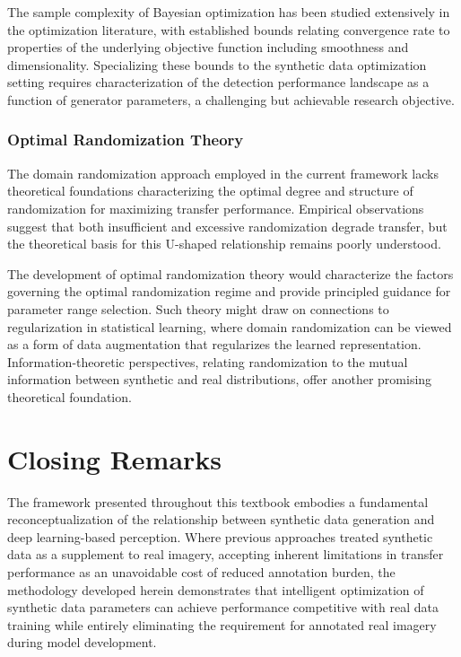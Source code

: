 The sample complexity of Bayesian optimization has been studied extensively in the optimization literature, with established bounds relating convergence rate to properties of the underlying objective function including smoothness and dimensionality. Specializing these bounds to the synthetic data optimization setting requires characterization of the detection performance landscape as a function of generator parameters, a challenging but achievable research objective.

\subsubsection{Optimal Randomization Theory}
\label{subsubsec:optimal_randomization}

The domain randomization approach employed in the current framework lacks theoretical foundations characterizing the optimal degree and structure of randomization for maximizing transfer performance. Empirical observations suggest that both insufficient and excessive randomization degrade transfer, but the theoretical basis for this U-shaped relationship remains poorly understood.

The development of optimal randomization theory would characterize the factors governing the optimal randomization regime and provide principled guidance for parameter range selection. Such theory might draw on connections to regularization in statistical learning, where domain randomization can be viewed as a form of data augmentation that regularizes the learned representation. Information-theoretic perspectives, relating randomization to the mutual information between synthetic and real distributions, offer another promising theoretical foundation.

\section{Closing Remarks}
\label{sec:closing_remarks}

The framework presented throughout this textbook embodies a fundamental reconceptualization of the relationship between synthetic data generation and deep learning-based perception. Where previous approaches treated synthetic data as a supplement to real imagery, accepting inherent limitations in transfer performance as an unavoidable cost of reduced annotation burden, the methodology developed herein demonstrates that intelligent optimization of synthetic data parameters can achieve performance competitive with real data training while entirely eliminating the requirement for annotated real imagery during model development.

